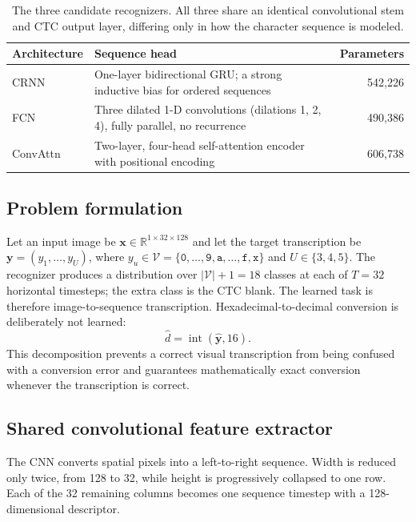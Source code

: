 \documentclass[10pt]{article}
\begin{document}
\begin{table}[H]
\centering
\begin{tabular}{@{}lp{8.6cm}r@{}}
\toprule
\textbf{Architecture} & \textbf{Sequence head} & \textbf{Parameters} \\
\midrule
CRNN & One-layer bidirectional GRU; a strong inductive bias for ordered
     sequences \cite{liu2022} & 542,226 \\
FCN & Three dilated 1-D convolutions (dilations 1, 2, 4), fully parallel,
    no recurrence \cite{yousef2018,coquenet2020} & 490,386 \\
ConvAttn & Two-layer, four-head self-attention encoder with positional encoding
         \cite{hernandezdiaz2021} & 606,738 \\
\bottomrule
\end{tabular}
\caption{The three candidate recognizers. All three share an identical convolutional
stem and CTC output layer, differing only in how the character sequence is modeled.}
\label{tab:models}
\end{table}

\subsection{Problem formulation}

Let an input image be
$\mathbf{x}\in\mathbb{R}^{1\times32\times128}$ and let the target transcription be
$\mathbf{y}=(y_1,\ldots,y_U)$, where
$y_u\in\mathcal{V}=\{\texttt{0},\ldots,\texttt{9},\texttt{a},\ldots,\texttt{f},
\texttt{x}\}$ and $U\in\{3,4,5\}$. The recognizer produces a distribution over
$|\mathcal{V}|+1=18$ classes at each of $T=32$ horizontal timesteps; the extra class
is the CTC blank. The learned task is therefore image-to-sequence transcription.
Hexadecimal-to-decimal conversion is deliberately not learned:
\[
    \hat{d} = \operatorname{int}(\hat{\mathbf{y}},16).
\]
This decomposition prevents a correct visual transcription from being confused with a
conversion error and guarantees mathematically exact conversion whenever the
transcription is correct.

\subsection{Shared convolutional feature extractor}

The CNN converts spatial pixels into a left-to-right sequence. Width is reduced only
twice, from 128 to 32, while height is progressively collapsed to one row. Each of the
32 remaining columns becomes one sequence timestep with a 128-dimensional descriptor.
\end{document}
